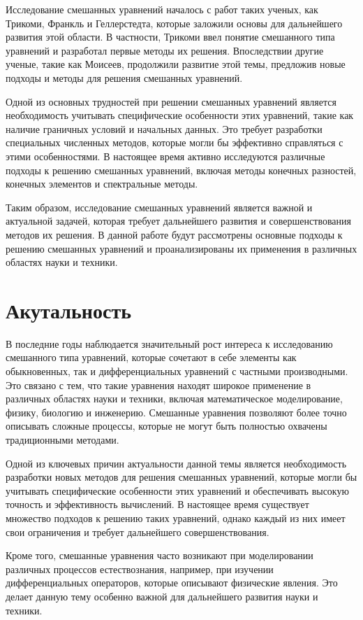 \documentclass[12pt, a4paper]{article}
\begin{document}
Исследование смешанных уравнений началось с работ таких ученых, как Трикоми, Франкль и Геллерстедта, которые заложили основы для дальнейшего развития этой области. В частности, Трикоми ввел понятие смешанного типа уравнений и разработал первые методы их решения. Впоследствии другие ученые, такие как Моисеев, продолжили развитие этой темы, предложив новые подходы и методы для решения смешанных уравнений.

Одной из основных трудностей при решении смешанных уравнений является необходимость учитывать специфические особенности этих уравнений, такие как наличие граничных условий и начальных данных. Это требует разработки специальных численных методов, которые могли бы эффективно справляться с этими особенностями. В настоящее время активно исследуются различные подходы к решению смешанных уравнений, включая методы конечных разностей, конечных элементов и спектральные методы.

Таким образом, исследование смешанных уравнений является важной и актуальной задачей, которая требует дальнейшего развития и совершенствования методов их решения. В данной работе будут рассмотрены основные подходы к решению смешанных уравнений и проанализированы их применения в различных областях науки и техники.
\newpage
\section{Акутальность}
В последние годы наблюдается значительный рост интереса к исследованию смешанного типа уравнений, которые сочетают в себе элементы как обыкновенных, так и дифференциальных уравнений с частными производными. Это связано с тем, что такие уравнения находят широкое применение в различных областях науки и техники, включая математическое моделирование, физику, биологию и инженерию. Смешанные уравнения позволяют более точно описывать сложные процессы, которые не могут быть полностью охвачены традиционными методами.

Одной из ключевых причин актуальности данной темы является необходимость разработки новых методов для решения смешанных уравнений, которые могли бы учитывать специфические особенности этих уравнений и обеспечивать высокую точность и эффективность вычислений. В настоящее время существует множество подходов к решению таких уравнений, однако каждый из них имеет свои ограничения и требует дальнейшего совершенствования.

Кроме того, смешанные уравнения часто возникают при моделировании различных процессов естествознания, например, при изучении дифференциальных операторов, которые описывают физические явления. Это делает данную тему особенно важной для дальнейшего развития науки и техники.
\end{document}

